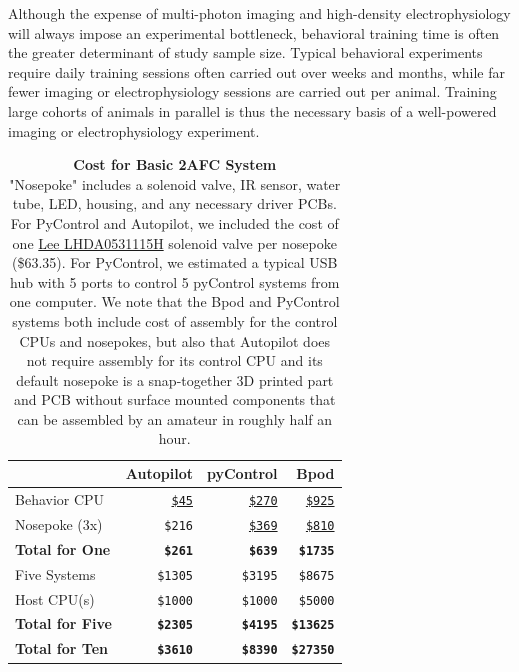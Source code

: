 Although the expense of multi-photon imaging and high-density electrophysiology will always impose an experimental bottleneck, behavioral training time is often the greater determinant of study sample size. Typical behavioral experiments require daily training sessions often carried out over weeks and months, while far fewer imaging or electrophysiology sessions are carried out per animal.  Training large cohorts of animals in parallel is thus the necessary basis of a well-powered imaging or electrophysiology experiment.


\begin{table}
\caption{\textbf{Cost for Basic 2AFC System}\\
\noindent"Nosepoke" includes a solenoid valve, IR sensor, water tube, LED, housing, and any necessary driver PCBs. For PyControl and Autopilot, we included the cost of one \href{https://wiki.auto-pi-lot.com/index.php/Lee_LHDA0531115H}{Lee LHDA0531115H} solenoid valve per nosepoke (\$63.35). For PyControl, we estimated a typical USB hub with 5 ports to control 5 pyControl systems from one computer. We note that the Bpod and PyControl systems both include cost of assembly for the control CPUs and nosepokes, but also that Autopilot does not require assembly for its control CPU and its default nosepoke is a snap-together 3D printed part and PCB without surface mounted components that can be assembled by an amateur in roughly half an hour.}
\label{tab:cost}
\noindent\begin{tabularx}{\linewidth}{XRRR}\toprule
& Autopilot & pyControl & Bpod  \\
\midrule
Behavior CPU & 
\href{https://www.adafruit.com/product/4292}{\texttt{\$45}} & 
\href{https://open-ephys.org/pycontrol/pycontrol}{\texttt{\$270}} & 
\href{https://sanworks.io/shop/viewproduct?productID=1024}{\texttt{\$925}}\\
Nosepoke (3x) & 
\texttt{\$216} & 
\href{http://www.open-ephys.org/store/pycontrol-peripherals}{\texttt{\$369}} & 
\href{https://sanworks.io/shop/viewproduct?productID=1009}{\texttt{\$810}} \\
\textbf{Total for One} & 
\textbf{\texttt{\$261}} & 
\textbf{\texttt{\$639}} & 
\textbf{\texttt{\$1735}}\\
\midrule
Five Systems & 
\texttt{\$1305} & 
\texttt{\$3195} & 
\texttt{\$8675} \\
Host CPU(s) & 
\texttt{\$1000} & 
\texttt{\$1000} & 
\texttt{\$5000} \\
\textbf{Total for Five} & 
\textbf{\texttt{\$2305}} & 
\textbf{\texttt{\$4195}} & 
\textbf{\texttt{\$13625}} \\
\midrule
\textbf{Total for Ten} & 
\textbf{\texttt{\$3610}} & 
\textbf{\texttt{\$8390}} & 
\textbf{\texttt{\$27350}} \\
\bottomrule
\end{tabularx}
\end{table}
